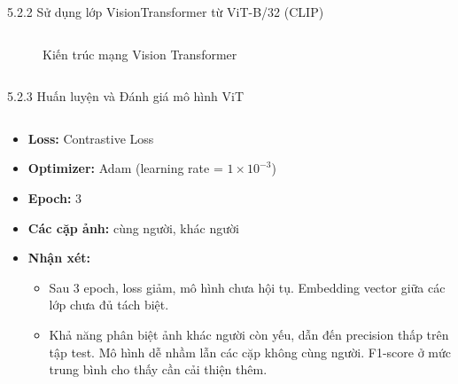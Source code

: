 \begin{frame}{5.2.2 Sử dụng lớp VisionTransformer từ ViT-B/32 (CLIP)}
\begin{columns}
\begin{column}{0.25\textwidth}
\begin{figure}
            \tiny Kiến trúc mạng Vision Transformer
        \end{figure}
    \end{column}
\end{columns}
\end{frame}


\begin{frame}{5.2.3 Huấn luyện và Đánh giá mô hình ViT}
\begin{columns}
    \begin{column}{0.5\textwidth}
        \small %
        \begin{itemize}
            \item \textbf{Loss:} Contrastive Loss
            \item \textbf{Optimizer:} Adam (learning rate = $1 \times 10^{-3}$)
            \item \textbf{Epoch:} 3
            \item \textbf{Các cặp ảnh:} cùng người, khác người
            \item \textbf{Nhận xét:}
            \begin{itemize}
                \item Sau 3 epoch, loss giảm, mô hình chưa hội tụ. Embedding vector giữa các lớp chưa đủ tách biệt.
                \item Khả năng phân biệt ảnh khác người còn yếu, dẫn đến precision thấp trên tập test. Mô hình dễ nhầm lẫn các cặp không cùng người. F1-score ở mức trung bình cho thấy cần cải thiện thêm.
            \end{itemize}
        \end{itemize}
    \end{column}


\end{columns}
\end{frame}
